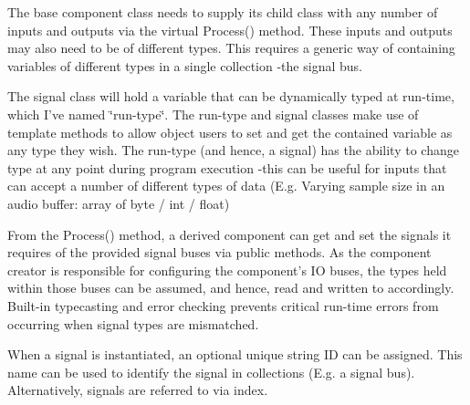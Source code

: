The base component class needs to supply its child class with any number of inputs and outputs via the virtual Process() method. These inputs and outputs may also need to be of different types. This requires a generic way of containing variables of different types in a single collection -\/the signal bus.

The signal class will hold a variable that can be dynamically typed at run-\/time, which I've named \char`\"{}run-\/type\char`\"{}. The run-\/type and signal classes make use of template methods to allow object users to set and get the contained variable as any type they wish. The run-\/type (and hence, a signal) has the ability to change type at any point during program execution -\/this can be useful for inputs that can accept a number of different types of data (E.\-g. Varying sample size in an audio buffer\-: array of byte / int / float)

From the Process() method, a derived component can get and set the signals it requires of the provided signal buses via public methods. As the component creator is responsible for configuring the component's I\-O buses, the types held within those buses can be assumed, and hence, read and written to accordingly. Built-\/in typecasting and error checking prevents critical run-\/time errors from occurring when signal types are mismatched.

When a signal is instantiated, an optional unique string I\-D can be assigned. This name can be used to identify the signal in collections (E.\-g. a signal bus). Alternatively, signals are referred to via index. 